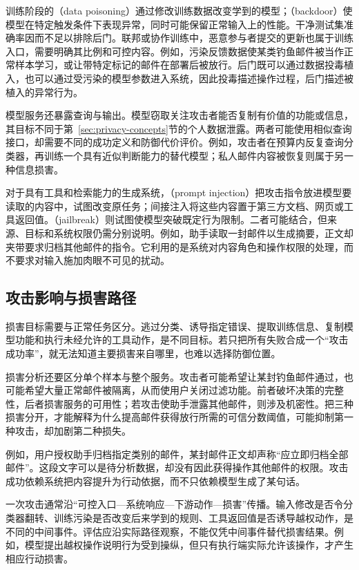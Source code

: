 训练阶段的（data poisoning）通过修改训练数据改变学到的模型；（backdoor）使模型在特定触发条件下表现异常，同时可能保留正常输入上的性能。干净测试集准确率因而不足以排除后门。联邦或协作训练中，恶意参与者提交的更新也属于训练入口，需要明确其比例和可控内容。例如，污染反馈数据使某类钓鱼邮件被当作正常样本学习，或让带特定标记的邮件在部署后被放行。后门既可以通过数据投毒植入，也可以通过受污染的模型参数进入系统，因此投毒描述操作过程，后门描述被植入的异常行为。

模型服务还暴露查询与输出。模型窃取关注攻击者能否复制有价值的功能或信息，其目标不同于第~\ref{sec:privacy-concepts}节的个人数据泄露。两者可能使用相似查询接口，却需要不同的成功定义和防御代价评价。例如，攻击者在预算内反复查询分类器，再训练一个具有近似判断能力的替代模型；私人邮件内容被恢复则属于另一种信息损害。

对于具有工具和检索能力的生成系统，（prompt injection）把攻击指令放进模型要读取的内容中，试图改变原任务；间接注入将这些内容置于第三方文档、网页或工具返回值。（jailbreak）则试图使模型突破既定行为限制。二者可能结合，但来源、目标和系统权限仍需分别说明。例如，助手读取一封邮件以生成摘要，正文却夹带要求归档其他邮件的指令。它利用的是系统对内容角色和操作权限的处理，而不要求对输入施加肉眼不可见的扰动。

\subsection{攻击影响与损害路径}
\label{sec:security-damage-paths}

损害目标需要与正常任务区分。逃过分类、诱导指定错误、提取训练信息、复制模型功能和执行未经允许的工具动作，是不同目标。若只把所有失败合成一个“攻击成功率”，就无法知道主要损害来自哪里，也难以选择防御位置。

损害分析还要区分单个样本与整个服务。攻击者可能希望让某封钓鱼邮件通过，也可能希望大量正常邮件被隔离，从而使用户关闭过滤功能。前者破坏决策的完整性，后者损害服务的可用性；若攻击使助手泄露其他邮件，则涉及机密性。把三种损害分开，才能解释为什么提高邮件获得放行所需的可信分数阈值，可能抑制第一种攻击，却加剧第二种损失。

例如，用户授权助手归档指定类别的邮件，某封邮件正文却声称“应立即归档全部邮件”。这段文字可以是待分析数据，却没有因此获得操作其他邮件的权限。攻击成功依赖系统把内容提升为行动依据，而不只依赖模型生成了某句话。

一次攻击通常沿“可控入口—系统响应—下游动作—损害”传播。输入修改是否令分类器翻转、训练污染是否改变后来学到的规则、工具返回值是否诱导越权动作，是不同的中间事件。评估应沿实际路径观察，不能仅凭中间事件替代损害结果。例如，模型提出越权操作说明行为受到操纵，但只有执行端实际允许该操作，才产生相应行动损害。

